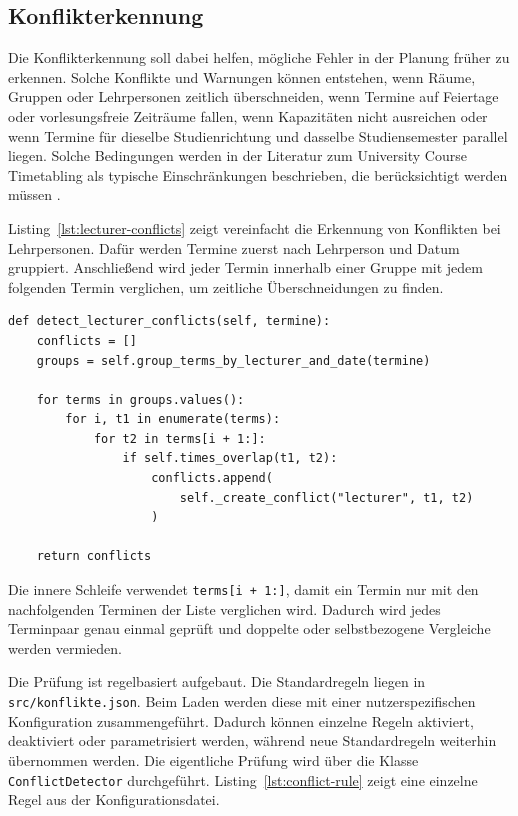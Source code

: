 \documentclass[12pt,a4paper]{article}
\begin{document}
\subsection{Konflikterkennung}

Die Konflikterkennung soll dabei helfen, mögliche Fehler in der Planung früher zu erkennen. Solche Konflikte und Warnungen können entstehen, wenn Räume, Gruppen oder Lehrpersonen zeitlich überschneiden, wenn Termine auf Feiertage oder vorlesungsfreie Zeiträume fallen, wenn Kapazitäten nicht ausreichen oder wenn Termine für dieselbe Studienrichtung und dasselbe Studiensemester parallel liegen. Solche Bedingungen werden in der Literatur zum University Course Timetabling als typische Einschränkungen beschrieben, die berücksichtigt werden müssen \cite{babaei2015survey}.

Listing~\ref{lst:lecturer-conflicts} zeigt vereinfacht die Erkennung von Konflikten bei Lehrpersonen. Dafür werden Termine zuerst nach Lehrperson und Datum gruppiert. Anschließend wird jeder Termin innerhalb einer Gruppe mit jedem folgenden Termin verglichen, um zeitliche Überschneidungen zu finden.
\begin{lstlisting}[caption={Vereinfachte Erkennung von Lehrpersonen-Konflikten}, label={lst:lecturer-conflicts}]
def detect_lecturer_conflicts(self, termine):
    conflicts = []
    groups = self.group_terms_by_lecturer_and_date(termine)

    for terms in groups.values():
        for i, t1 in enumerate(terms):
            for t2 in terms[i + 1:]:
                if self.times_overlap(t1, t2):
                    conflicts.append(
                        self._create_conflict("lecturer", t1, t2)
                    )

    return conflicts
\end{lstlisting}
Die innere Schleife verwendet \texttt{terms[i + 1:]}, damit ein Termin nur mit den nachfolgenden Terminen der Liste verglichen wird. Dadurch wird jedes Terminpaar genau einmal geprüft und doppelte oder selbstbezogene Vergleiche werden vermieden.

Die Prüfung ist regelbasiert aufgebaut.
Die Standardregeln liegen in \texttt{src/konflikte.json}. Beim Laden werden diese mit einer nutzerspezifischen Konfiguration zusammengeführt.
Dadurch können einzelne Regeln aktiviert, deaktiviert oder parametrisiert werden, während neue Standardregeln weiterhin übernommen werden.
Die eigentliche Prüfung wird über die Klasse \texttt{ConflictDetector} durchgeführt. Listing~\ref{lst:conflict-rule} zeigt eine einzelne Regel aus der Konfigurationsdatei.
\end{document}
